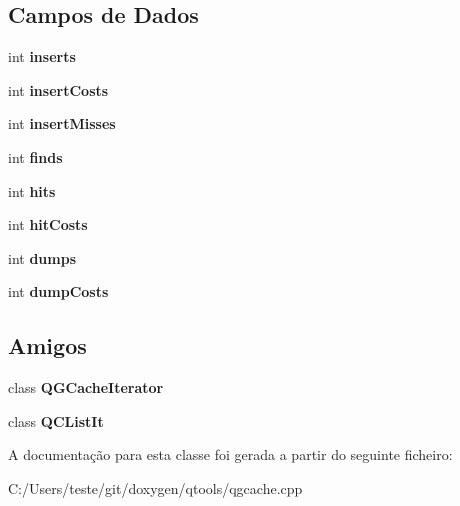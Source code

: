 \subsection*{Campos de Dados}
\begin{DoxyCompactItemize}
\item 
\hypertarget{class_q_c_list_aab7be3ba391d70d8b3beceae3165e5a5}{int {\bfseries inserts}}\label{class_q_c_list_aab7be3ba391d70d8b3beceae3165e5a5}

\item 
\hypertarget{class_q_c_list_a8e57483c57e821d4489a83e760cf76e7}{int {\bfseries insert\-Costs}}\label{class_q_c_list_a8e57483c57e821d4489a83e760cf76e7}

\item 
\hypertarget{class_q_c_list_a56cb778b8f94a1bcf1b51cd13c4a412a}{int {\bfseries insert\-Misses}}\label{class_q_c_list_a56cb778b8f94a1bcf1b51cd13c4a412a}

\item 
\hypertarget{class_q_c_list_afc9a3fe60de38fcf956edb5291cd8e94}{int {\bfseries finds}}\label{class_q_c_list_afc9a3fe60de38fcf956edb5291cd8e94}

\item 
\hypertarget{class_q_c_list_a6eb4f6f645392a720b883b687918880f}{int {\bfseries hits}}\label{class_q_c_list_a6eb4f6f645392a720b883b687918880f}

\item 
\hypertarget{class_q_c_list_a2b0aeab6d3c893c50489f1a400fd0a98}{int {\bfseries hit\-Costs}}\label{class_q_c_list_a2b0aeab6d3c893c50489f1a400fd0a98}

\item 
\hypertarget{class_q_c_list_a0e21339fa903915689748d0a7db31628}{int {\bfseries dumps}}\label{class_q_c_list_a0e21339fa903915689748d0a7db31628}

\item 
\hypertarget{class_q_c_list_a1256de692bb8bc1daef9e0310cbe1562}{int {\bfseries dump\-Costs}}\label{class_q_c_list_a1256de692bb8bc1daef9e0310cbe1562}

\end{DoxyCompactItemize}
\subsection*{Amigos}
\begin{DoxyCompactItemize}
\item 
\hypertarget{class_q_c_list_a37933afdeb94bef86bf66aca84fc229c}{class {\bfseries Q\-G\-Cache\-Iterator}}\label{class_q_c_list_a37933afdeb94bef86bf66aca84fc229c}

\item 
\hypertarget{class_q_c_list_a3e8195ca5690dd80612249a0ccb62f8f}{class {\bfseries Q\-C\-List\-It}}\label{class_q_c_list_a3e8195ca5690dd80612249a0ccb62f8f}

\end{DoxyCompactItemize}


A documentação para esta classe foi gerada a partir do seguinte ficheiro\-:\begin{DoxyCompactItemize}
\item 
C\-:/\-Users/teste/git/doxygen/qtools/qgcache.\-cpp\end{DoxyCompactItemize}
